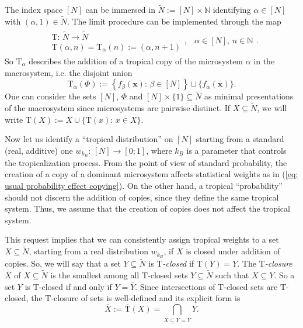 \documentclass[11pt,british,reqno]{article}
\numberwithin{equation}{section}
\numberwithin{figure}{section}
\numberwithin{table}{section}
\theoremstyle{definition}
\theoremstyle{definition}
\theoremstyle{plain}
\theoremstyle{plain}
\theoremstyle{remark}
\theoremstyle{plain}
\numberwithin{equation}{section}
\numberwithin{figure}{section}
\numberwithin{table}{section}
\theoremstyle{plain}
\begin{document}
The index space $[N]$ can be immersed in $\tilde{N}:=[N]\times\mathbb{N}$
identifying $\alpha\in[N]$ with $(\alpha,1)\in\tilde{N}$. The limit
procedure can be implemented through the map 
\begin{equation}
\begin{array}{cc}
\begin{array}{c}
\mathrm{T}:\,\tilde{N}\longrightarrow\tilde{N}\\
\mathrm{T}(\alpha,n)=\mathrm{T}_{\alpha}(n):=(\alpha,n+1)
\end{array}, & \alpha\in[N],\,n\in\mathbb{N}\end{array}.\label{eq: tropical copies}
\end{equation}
So $\mathrm{T}_{\alpha}$ describes the addition of a tropical copy
of the microsystem $\alpha$ in the macrosystem, i.e. the disjoint
union 
\begin{equation}
\mathrm{T}_{\alpha}(\Phi):=\left\{ f_{\beta}(\boldsymbol{x}):\,\beta\in[N]\right\} \sqcup\{f_{\alpha}(\boldsymbol{x})\}.\label{eq: tropical copies set}
\end{equation}
One can consider the sets $[N]$, $\Phi$ and $[N]\times\{1\}\subseteq\tilde{N}$
as minimal presentations of the macrosystem since microsystems are
pairwise distinct. If $X\subseteq\tilde{N}$, we will write $\mathrm{T}(X):=X\cup\{\mathrm{T}(x):\,x\in X\}$. 

Now let us identify a ``tropical distribution''
on $[N]$ starting from a standard (real, additive) one $w_{k_{B}}:\,[N]\longrightarrow[0;1]$,
where $k_{B}$ is a parameter that controls the tropicalization process.
From the point of view of standard probability, the creation of a
copy of a dominant microsystem affects statistical weights as in (\ref{eq: usual probability effect copying}).
On the other hand, a tropical ``probability'' should not discern
the addition of copies, since they define the same tropical system. Thus, we assume that the creation of copies does not affect the tropical system. 

This request implies that we can consistently assign tropical weights to a set $X\subseteq\tilde{N}$, starting from a real distribution $w_{k_{B}}$, if $X$ is closed under addition of copies. So, we will say that a set $Y\subseteq\tilde{N}$ is \textit{$\mathrm{T}$-closed} if $\mathrm{T}(Y)=Y$. The \textit{$\mathrm{T}$-closure}
$\overline{X}$ of $X\subseteq\tilde{N}$ is the smallest among all
$\mathrm{T}$-closed sets $Y\subseteq\tilde{N}$ such that $X\subseteq Y$. So a set $Y$ is $\mathrm{T}$-closed if and only if $Y=\overline{Y}$.  Since intersections of $\mathrm{T}$-closed sets are $\mathrm{T}$-closed,
the $\mathrm{T}$-closure of sets is well-defined and its explicit
form is 
\begin{equation}
\overline{X}:=\overline{\mathrm{T}}(X)=\bigcap_{X\subseteq Y=\overline{Y}}Y.\label{eq: replica closure}
\end{equation}
\end{document}
